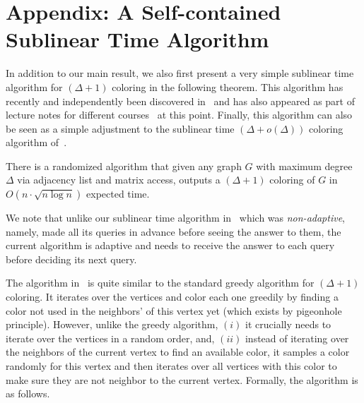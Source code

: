 

\clearpage

\appendix
\section{Appendix: A Self-contained Sublinear Time Algorithm}\label{sec:warm-up}

In addition to our main result, we also first present a very simple sublinear time algorithm for $(\Delta+1)$ coloring in the following theorem. This algorithm has recently and independently been discovered in~\cite{ferber2025improved} 
and has also appeared as part of lecture notes for different courses~\cite{Lec24,Lec25,HW} at this point. Finally, this algorithm can also be seen as a simple adjustment to the sublinear time $(\Delta+o(\Delta))$ coloring algorithm of~\cite{MorrisS21}. 


\begin{theorem}\label{thm:warm-up}
	There is a randomized algorithm that given any graph $G$ with maximum degree $\Delta$ via adjacency list and matrix access, 
	outputs a $(\Delta+1)$ coloring of $G$ in  $O(n \cdot \sqrt{n\log{n}})$ expected time. 
\end{theorem}

We note that unlike our sublinear time algorithm in~ which was \emph{non-adaptive}, namely, made all its queries in advance before seeing the answer to them, the current algorithm is adaptive and needs to 
receive the answer to each query before deciding its next query. 

The algorithm in~ is quite similar to the standard greedy algorithm for $(\Delta+1)$ coloring. It iterates over the vertices
and color each one greedily by finding a color not used in the neighbors' of this vertex yet (which exists by pigeonhole principle). However, unlike the greedy algorithm, $(i)$ it crucially needs to iterate
over the vertices in a random order, and, $(ii)$ instead of 
iterating over the neighbors of the current vertex to find an available color, it samples a color randomly for this vertex and then iterates over all vertices with this color to make sure they are not neighbor to the current vertex. 
Formally, the algorithm is as follows. 

